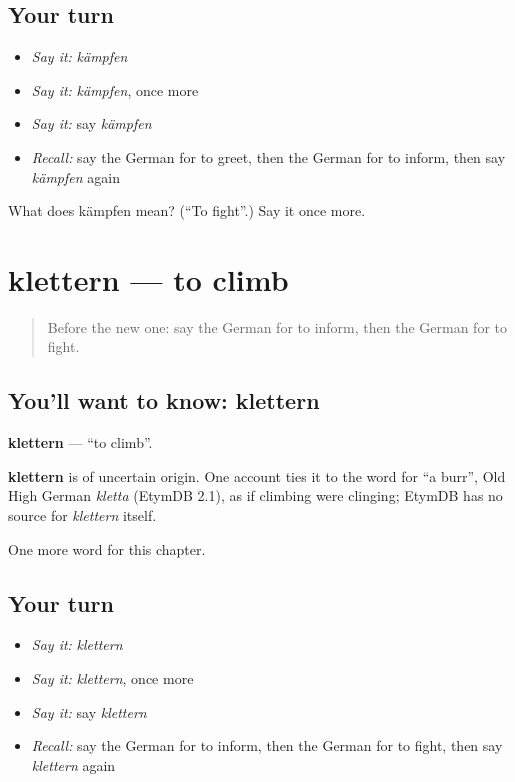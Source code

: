 \subsection*{Your turn}
\begin{itemize}
\raggedright
  \item \emph{Say it:} \emph{kämpfen}
  \item \emph{Say it:} \emph{kämpfen}, once more
  \item \emph{Say it:} say \emph{kämpfen}
  \item \emph{Recall:} say the German for to greet, then the German for to inform, then say \emph{kämpfen} again
\end{itemize}

\begin{tcolorbox}[breakable,colback=teal!4,colframe=teal!35!black,title={Before you move on}]
What does kämpfen mean? (\textquotedblleft{}To fight\textquotedblright{}.) Say it once more.
\end{tcolorbox}
\section[klettern]{klettern — to climb}

\label{lesson:GE-C182-klettern}



\begin{quote}
Before the new one: say the German for to inform, then the German for to fight.
\end{quote}

\subsection*{You'll want to know: klettern}
\textbf{klettern} — \textquotedblleft{}to climb\textquotedblright{}.

\begin{cousinweb}
\textbf{klettern} is of uncertain origin. One account ties it to the word for \textquotedblleft{}a burr\textquotedblright{}, Old High German \emph{kletta} (EtymDB 2.1), as if climbing were clinging; EtymDB has no source for \emph{klettern} itself.
\end{cousinweb}

\begin{grammarlens}[title={What you've built}]
One more word for this chapter.
\end{grammarlens}

\subsection*{Your turn}
\begin{itemize}
\raggedright
  \item \emph{Say it:} \emph{klettern}
  \item \emph{Say it:} \emph{klettern}, once more
  \item \emph{Say it:} say \emph{klettern}
  \item \emph{Recall:} say the German for to inform, then the German for to fight, then say \emph{klettern} again
\end{itemize}

